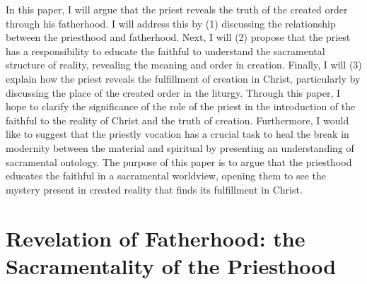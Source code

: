 \documentclass[twoside,10pt]{article}
\begin{document}
In this paper, I will argue that the priest reveals the truth of the created order through his fatherhood. I will address this by (1) discussing the relationship between the priesthood and fatherhood. Next, I will (2) propose that the priest has a responsibility to educate the faithful to understand the sacramental structure of reality, revealing the meaning and order in creation. Finally, I will (3) explain how the priest reveals the fulfillment of creation in Christ, particularly by discussing the place of the created order in the liturgy. Through this paper, I hope to clarify the significance of the role of the priest in the introduction of the faithful to the reality of Christ and the truth of creation. Furthermore, I would like to suggest that the priestly vocation has a crucial task to heal the break in modernity between the material and spiritual by presenting an understanding of sacramental ontology. The purpose of this paper is to argue that the priesthood educates the faithful in a sacramental worldview, opening them to see the mystery present in created reality that finds its fulfillment in Christ.


\section{Revelation of Fatherhood: the Sacramentality of the Priesthood}
\end{document}
